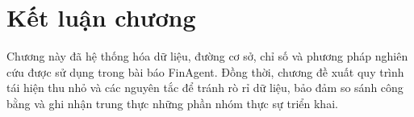 \section{Kết luận chương}
Chương này đã hệ thống hóa dữ liệu, đường cơ sở, chỉ số và phương pháp nghiên cứu được sử dụng trong bài báo FinAgent. Đồng thời, chương đề xuất quy trình tái hiện thu nhỏ và các nguyên tắc để tránh rò rỉ dữ liệu, bảo đảm so sánh công bằng và ghi nhận trung thực những phần nhóm thực sự triển khai.
